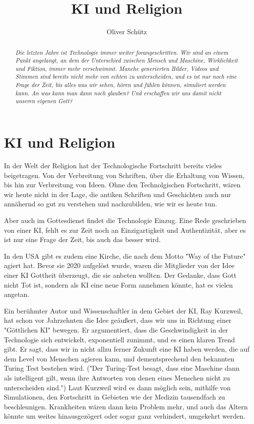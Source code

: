 \documentclass[10pt]{article}
\title{KI und Religion}
\author{Oliver Schütz}
\begin{document}
\maketitle



\begin{abstract}
  \textit
  {Die letzten Jahre ist Technologie immer weiter forangeschritten.
  Wir sind an einem Punkt angelangt, an dem der Unterschied zwischen Mensch und Maschine,
  Wirklichkeit und Fiktion, immer mehr verschwimmt.
  Manche generierten Bilder, Videos und Stimmen sind bereits nicht mehr von echten zu unterscheiden,
  und es ist nur noch eine Frage der Zeit, bis alles was wir sehen, hören und fühlen können, simuliert werden kann.
  An was kann man dann noch glauben? Und erschaffen wir uns damit nicht unseren eigenen Gott?
  }
\end{abstract}

\tableofcontents
\newpage
\section{KI und Religion}
In der Welt der Religion hat der Technologische Fortschritt bereits vieles beigetragen.
Von der Verbreitung von Schriften, über die Erhaltung von Wissen, bis hin zur Verbreitung von Ideen.
Ohne den Technolgischen Fortschritt, wären wir heute nicht in der Lage, die antiken Schriften und Geschichten auch nur annähernd so gut zu verstehen und nachzubilden, wie wir es heute tun.

Aber auch im Gottesdienst findet die Technologie Einzug.
Eine Rede geschrieben von einer KI, fehlt es zur Zeit noch an Einzigartigkeit und Authentizität, aber es ist nur eine Frage der Zeit, bis auch das besser wird.

In den USA gibt es zudem eine Kirche, die nach dem Motto "Way of the Future" agiert hat.
Bevor sie 2020 aufgelöst wurde, waren die Mitglieder von der Idee einer KI Gottheit überzeugt, die sie anbeten wollten.
Der Gedanke, dass Gott nicht Tot ist, sondern als KI eine neue Form annehmen könnte, hat es vielen angetan.
\cite{BR}

Ein berühmter Autor und Wissenschaftler in dem Gebiet der KI, Ray Kurzweil, hat schon vor Jahrzehnten die Idee geäußert, dass wir uns in Richtung einer "Göttlichen KI" bewegen.
Er argumentiert, dass die Geschwindigkeit in der Technologie sich entwickelt, exponentiell zunimmt, und es einen klaren Trend gibt.
Er sagt, dass wir in nicht allzu ferner Zukunft eine KI haben werden, die auf dem Level von Menschen agieren kann, und dementsprechend den bekannten Turing Test bestehen wird.
("Der Turing-Test besagt, dass eine Maschine dann als intelligent gilt, wenn ihre Antworten von denen eines Menschen nicht zu unterscheiden sind.")
Laut Kurzweil wird es dann möglich sein, mithilfe von Simulationen, den Fortschritt in Gebieten wie der Medizin tausendfach zu beschleunigen.
Krankheiten wären dann kein Problem mehr, und auch das Altern könnte um weites hinausgezögert oder sogar ganz verhindert, umgekehrt werden.
\end{document}
